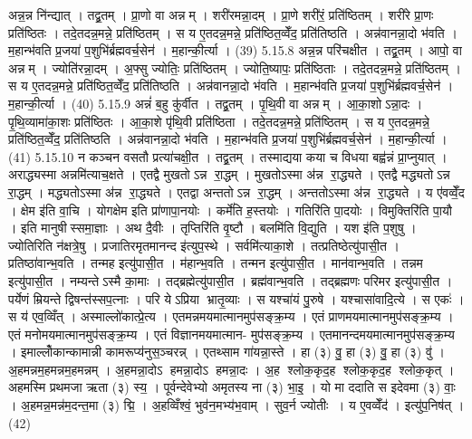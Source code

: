 अन्न॒न्न नि॑न्द्यात् । तद्व्र॒तम् । प्रा॒णो वा अन्नम् । शरी॑रमन्ना॒दम् । प्रा॒णे शरी॑रं॒ प्रति॑ष्ठितम् । शरी॑रे प्रा॒णः प्रति॑ष्ठितः । तदे॒तदन्न॒मन्ने॒ प्रति॑ष्ठितम् । स य ए॒तदन्न॒मन्ने॒ प्रति॑ष्ठित॒व्वेँद॒ प्रति॑तिष्ठति । अन्न॑वानन्ना॒दो भ॑वति । म॒हान्भ॑वति प्र॒जया॑ प॒शुभि॑र्ब्रह्मवर्च॒सेन॑ । म॒हान्की॒र्त्या । (39)
5.15.8
अन्न॒न्न परि॑चक्षीत । तद्व्र॒तम् । आपो॒ वा अन्नम् । ज्योति॑रन्ना॒दम् । अ॒फ्सु ज्योतिः॒ प्रति॑ष्ठितम् । ज्योति॒ष्यापः॒ प्रति॑ष्ठिताः । तदे॒तदन्न॒मन्ने॒ प्रति॑ष्ठितम् । स य ए॒तदन्न॒मन्ने॒ प्रति॑ष्ठित॒व्वेँद॒ प्रति॑तिष्ठति । अन्न॑वानन्ना॒दो भ॑वति । म॒हान्भ॑वति प्र॒जया॑ प॒शुभि॑र्ब्रह्मवर्च॒सेन॑ । म॒हान्की॒र्त्या । (40)
5.15.9
अन्नं॑ ब॒हु कु॑र्वीत । तद्व्र॒तम् । पृ॒थि॒वी वा अन्नम् । आ॒का॒शोऽन्ना॒दः । पृ॒थि॒व्यामा॑का॒शः प्रति॑ष्ठितः । आ॒का॒शे पृ॑थि॒वी प्रति॑ष्ठिता । तदे॒तदन्न॒मन्ने॒ प्रति॑ष्ठितम् । स य ए॒तदन्न॒मन्ने॒ प्रति॑ष्ठित॒व्वेँद॒ प्रति॑तिष्ठति । अन्न॑वानन्ना॒दो भ॑वति । म॒हान्भ॑वति प्र॒जया॑ प॒शुभि॑र्ब्रह्मवर्च॒सेन॑ । म॒हान्की॒र्त्या । (41)
5.15.10
न कञ्चन वसतौ प्रत्या॑चक्षी॒त । तद्व्र॒तम् । तस्माद्यया कया च विधया बह्व॑न्नं प्रा॒प्नुयात् । अराद्ध्यस्मा अन्नमि॑त्याच॒क्षते । एतद्वै मुखतोऽन्न रा॒द्धम् । मुखतोऽस्मा अ॑न्न रा॒द्ध्यते । एतद्वै मद्ध्यतोऽन्न रा॒द्धम् । मद्ध्यतोऽस्मा अ॑न्न रा॒द्ध्यते । एतद्वा अन्ततोऽन्न रा॒द्धम् । अन्ततोऽस्मा अ॑न्न रा॒द्ध्यते । य ए॑वव्वेँ॒द । क्षेम इ॑ति वा॒चि । योगक्षेम इति प्रा॑णापा॒नयोः । कर्मे॑ति ह॒स्तयोः । गतिरि॑ति पा॒दयोः । विमुक्तिरि॑ति पा॒यौ । इति मानुषीस्समा॒ज्ञाः । अथ दै॒वीः । तृप्तिरि॑ति वृ॒ष्टौ । बलमि॑ति वि॒द्युति । यश इ॑ति प॒शुषु । ज्योतिरिति न॑क्षत्रे॒षु । प्रजातिरमृतमानन्द इ॑त्युप॒स्थे । सर्वमि॑त्याका॒शे । तत्प्रतिष्ठेत्यु॑पासी॒त । प्रतिष्ठा॑वान्भ॒वति । तन्मह इत्यु॑पासी॒त । म॑हान्भ॒वति । तन्मन इत्यु॑पासी॒त । मान॑वान्भ॒वति । तन्नम इत्यु॑पासी॒त । नम्यन्तेऽस्मै का॒माः । तद्ब्रह्मेत्यु॑पासी॒त । ब्रह्म॑वान्भ॒वति । तद्ब्रह्मणः परिमर इत्यु॑पासी॒त । पर्येणं म्रियन्ते द्विषन्त॑स्सप॒त्नाः । परि येऽप्रिया भ्रातृ॒व्याः । स यश्चा॑यं पु॒रुषे । यश्चासा॑वादि॒त्ये । स एकः॑ । स य॑ एव॒व्विँत् । अस्माल्लो॑कात्प्रे॒त्य । एतमन्नमयमात्मानमुप॑सङ्क्र॒म्य । एतं प्राणमयमात्मानमुप॑सङ्क्र॒म्य । एतं मनोमयमात्मानमुप॑सङ्क्र॒म्य । एतं विज्ञानमयमात्मान- मुप॑सङ्क्र॒म्य । एतमानन्दमयमात्मानमुप॑सङ्क्र॒म्य । इमाल्लोँकान्कामान्नी कामरूप्य॑नुस॒ञ्चरन्न् । एतथ्साम गा॑यन्ना॒स्ते । हा (३) वु॒ हा (३) वु॒ हा (३) वु॑ । अ॒हमन्नम॒हमन्नम॒हमन्नम् । अ॒हमन्ना॒दोऽ हमन्ना॒दोऽ हमन्ना॒दः । अ॒ह श्लोक॒कृद॒ह श्लोक॒कृद॒ह श्लोक॒कृत् । अहमस्मि प्रथमजा ऋता (३) स्य॒ । पूर्वन्देवेभ्यो अमृतस्य ना (३) भा॒इ॒ । यो मा ददाति स इदेवमा (३) वाः॒ । अ॒हमन्न॒मन्न॑म॒दन्त॒मा (३) द्मि॒ । अ॒हव्विँश्वं॒ भुव॑न॒मभ्य॑भ॒वाम् । सुव॒र्न ज्योतीः । य ए॒वव्वेँद॑ । इत्यु॑प॒निष॑त् । (42)

